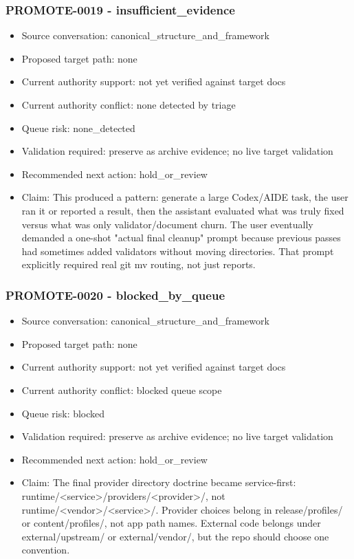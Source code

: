 \documentclass[11pt,a4paper]{report}
\begin{document}
\subsubsection{PROMOTE-0019 - insufficient\_evidence}

\begin{itemize}
\item Source conversation: canonical\_structure\_and\_framework
\item Proposed target path: none
\item Current authority support: not yet verified against target docs
\item Current authority conflict: none detected by triage
\item Queue risk: none\_detected
\item Validation required: preserve as archive evidence; no live target validation
\item Recommended next action: hold\_or\_review
\item Claim: This produced a pattern: generate a large Codex/AIDE task, the user ran it or reported a result, then the assistant evaluated what was truly fixed versus what was only validator/document churn. The user eventually demanded a one-shot "actual final cleanup" prompt because previous passes had sometimes added validators without moving directories. That prompt explicitly required real git mv routing, not just reports.
\end{itemize}

\subsubsection{PROMOTE-0020 - blocked\_by\_queue}

\begin{itemize}
\item Source conversation: canonical\_structure\_and\_framework
\item Proposed target path: none
\item Current authority support: not yet verified against target docs
\item Current authority conflict: blocked queue scope
\item Queue risk: blocked
\item Validation required: preserve as archive evidence; no live target validation
\item Recommended next action: hold\_or\_review
\item Claim: The final provider directory doctrine became service-first: runtime/<service>/providers/<provider>/, not runtime/<vendor>/<service>/. Provider choices belong in release/profiles/ or content/profiles/, not app path names. External code belongs under external/upstream/ or external/vendor/, but the repo should choose one convention.
\end{itemize}
\end{document}
